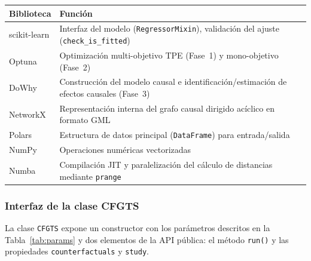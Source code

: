 \documentclass[12pt]{report} %
\begin{document}
\begin{table}[H]
    {\begin{tabular}{|p{3cm}|p{9cm}|}
            \hline
            \textbf{Biblioteca} & \textbf{Función}                                                                                  \\
            \hline
            scikit-learn        & Interfaz del modelo (\texttt{RegressorMixin}), validación del ajuste (\texttt{check\_is\_fitted}) \\
            \hline
            Optuna              & Optimización multi-objetivo TPE (Fase~1) y mono-objetivo (Fase~2)                                 \\
            \hline
            DoWhy               & Construcción del modelo causal e identificación/estimación de efectos causales (Fase~3)           \\
            \hline
            NetworkX            & Representación interna del grafo causal dirigido acíclico en formato GML                          \\
            \hline
            Polars              & Estructura de datos principal (\texttt{DataFrame}) para entrada/salida                            \\
            \hline
            NumPy               & Operaciones numéricas vectorizadas                                                                \\
            \hline
            Numba               & Compilación JIT y paralelización del cálculo de distancias mediante \texttt{prange}               \\
            \hline
        \end{tabular}}
\end{table}

\subsubsection{Interfaz de la clase CFGTS}

La clase \texttt{CFGTS} expone un constructor con los parámetros descritos en la Tabla~\ref{tab:params} y dos elementos de la API pública: el método \texttt{run()} y las propiedades \texttt{counterfactuals} y \texttt{study}.
\end{document}
